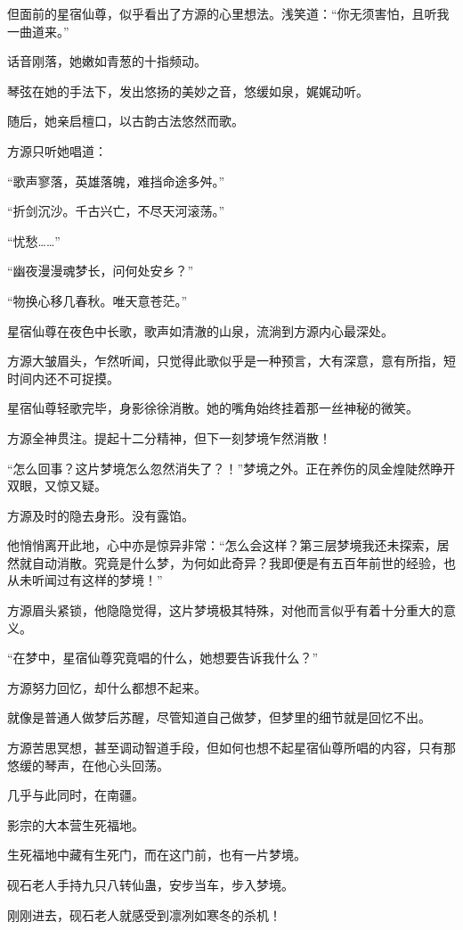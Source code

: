 \begin{this_body}
但面前的星宿仙尊，似乎看出了方源的心里想法。浅笑道：“你无须害怕，且听我一曲道来。”

话音刚落，她嫩如青葱的十指频动。

琴弦在她的手法下，发出悠扬的美妙之音，悠缓如泉，娓娓动听。

随后，她亲启檀口，以古韵古法悠然而歌。

方源只听她唱道：

“歌声寥落，英雄落魄，难挡命途多舛。”

“折剑沉沙。千古兴亡，不尽天河滚荡。”

“忧愁……”

“幽夜漫漫魂梦长，问何处安乡？”

“物换心移几春秋。唯天意苍茫。”

星宿仙尊在夜色中长歌，歌声如清澈的山泉，流淌到方源内心最深处。

方源大皱眉头，乍然听闻，只觉得此歌似乎是一种预言，大有深意，意有所指，短时间内还不可捉摸。

星宿仙尊轻歌完毕，身影徐徐消散。她的嘴角始终挂着那一丝神秘的微笑。

方源全神贯注。提起十二分精神，但下一刻梦境乍然消散！

“怎么回事？这片梦境怎么忽然消失了？！”梦境之外。正在养伤的凤金煌陡然睁开双眼，又惊又疑。

方源及时的隐去身形。没有露馅。

他悄悄离开此地，心中亦是惊异非常：“怎么会这样？第三层梦境我还未探索，居然就自动消散。究竟是什么梦，为何如此奇异？我即便是有五百年前世的经验，也从未听闻过有这样的梦境！”

方源眉头紧锁，他隐隐觉得，这片梦境极其特殊，对他而言似乎有着十分重大的意义。

“在梦中，星宿仙尊究竟唱的什么，她想要告诉我什么？”

方源努力回忆，却什么都想不起来。

就像是普通人做梦后苏醒，尽管知道自己做梦，但梦里的细节就是回忆不出。

方源苦思冥想，甚至调动智道手段，但如何也想不起星宿仙尊所唱的内容，只有那悠缓的琴声，在他心头回荡。

几乎与此同时，在南疆。

影宗的大本营生死福地。

生死福地中藏有生死门，而在这门前，也有一片梦境。

砚石老人手持九只八转仙蛊，安步当车，步入梦境。

刚刚进去，砚石老人就感受到凛冽如寒冬的杀机！


\end{this_body}

